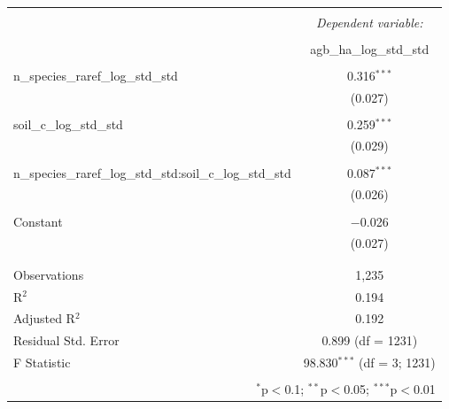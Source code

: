
\begin{table}[!htbp] \centering 
  \caption{} 
  \label{soil_div_int_mod} 
\begin{tabular}{@{\extracolsep{5pt}}lc} 
\\[-1.8ex]\hline 
\hline \\[-1.8ex] 
 & \multicolumn{1}{c}{\textit{Dependent variable:}} \\ 
\cline{2-2} 
\\[-1.8ex] & agb\_ha\_log\_std\_std \\ 
\hline \\[-1.8ex] 
 n\_species\_raref\_log\_std\_std & 0.316$^{***}$ \\ 
  & (0.027) \\ 
  & \\ 
 soil\_c\_log\_std\_std & 0.259$^{***}$ \\ 
  & (0.029) \\ 
  & \\ 
 n\_species\_raref\_log\_std\_std:soil\_c\_log\_std\_std & 0.087$^{***}$ \\ 
  & (0.026) \\ 
  & \\ 
 Constant & $-$0.026 \\ 
  & (0.027) \\ 
  & \\ 
\hline \\[-1.8ex] 
Observations & 1,235 \\ 
R$^{2}$ & 0.194 \\ 
Adjusted R$^{2}$ & 0.192 \\ 
Residual Std. Error & 0.899 (df = 1231) \\ 
F Statistic & 98.830$^{***}$ (df = 3; 1231) \\ 
\hline 
\hline \\[-1.8ex] 
\multicolumn{2}{r}{$^{*}$p$<$0.1; $^{**}$p$<$0.05; $^{***}$p$<$0.01} \\ 
\end{tabular} 
\end{table} 
